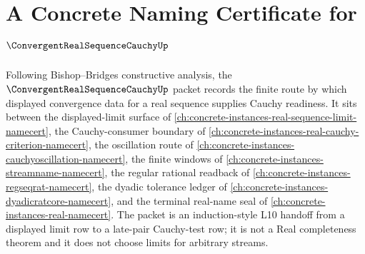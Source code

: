 \chapter{A Concrete Naming Certificate for $\ConvergentRealSequenceCauchyUp$}
\label{ch:concrete-instances-convergent-real-sequence-cauchy-namecert}

Following Bishop--Bridges constructive analysis, the $\ConvergentRealSequenceCauchyUp$ packet records the finite route by which displayed convergence data for a real sequence supplies Cauchy readiness. It sits between the displayed-limit surface of \autoref{ch:concrete-instances-real-sequence-limit-namecert}, the Cauchy-consumer boundary of \autoref{ch:concrete-instances-real-cauchy-criterion-namecert}, the oscillation route of \autoref{ch:concrete-instances-cauchyoscillation-namecert}, the finite windows of \autoref{ch:concrete-instances-streamname-namecert}, the regular rational readback of \autoref{ch:concrete-instances-regseqrat-namecert}, the dyadic tolerance ledger of \autoref{ch:concrete-instances-dyadicratcore-namecert}, and the terminal real-name seal of \autoref{ch:concrete-instances-real-namecert}. The packet is an induction-style L10 handoff from a displayed limit row to a late-pair Cauchy-test row; it is not a Real completeness theorem and it does not choose limits for arbitrary streams.

